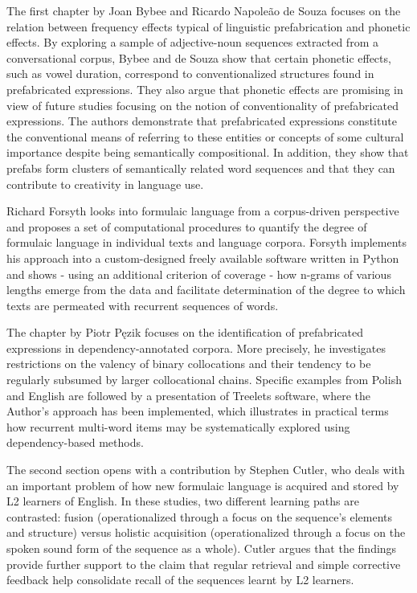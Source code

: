 \documentclass[output=paper]{langsci/langscibook}
\begin{document}
The first chapter by Joan Bybee and Ricardo Napoleão de Souza focuses on the relation between frequency effects typical of linguistic prefabrication and phonetic effects. By exploring a sample of adjective-noun sequences extracted from a conversational corpus, Bybee and de Souza show that certain phonetic effects, such as vowel duration, correspond to conventionalized structures found in prefabricated expressions. They also argue that phonetic effects are promising in view of future studies focusing on the notion of conventionality of prefabricated expressions. The authors demonstrate that prefabricated expressions constitute the conventional means of referring to these entities or concepts of some cultural importance despite being semantically compositional. In addition, they show that %
prefabs form clusters of semantically related word sequences and that they can contribute to creativity in language use.



Richard Forsyth looks into formulaic language from a corpus-driven perspective and proposes a set of computational procedures to quantify the degree of formulaic language in individual texts and language corpora. Forsyth implements his approach into a custom-designed freely available software written in Python and shows - using an additional criterion of coverage - how n-grams of various lengths  emerge from the data and facilitate determination of the degree to which texts are permeated with recurrent sequences of words.



The chapter by Piotr Pęzik focuses on the identification of prefabricated expressions in dependency-annotated corpora. More precisely, he investigates restrictions on the valency of binary collocations and their tendency to be regularly subsumed by larger collocational chains. Specific examples from Polish and English are followed by a presentation of Treelets software, where the Author’s approach has been implemented, which illustrates in practical terms how recurrent multi-word items may be systematically explored using dependency-based methods.



The second section opens with a contribution by Stephen Cutler, who deals with an important problem of how new formulaic language is acquired and stored by L2 learners of English. In these studies, two different learning paths are contrasted: fusion (operationalized through a focus on the sequence’s elements and structure) versus holistic acquisition (operationalized through a focus on the spoken sound form of the sequence as a whole). Cutler argues that the findings provide further support to the claim that regular retrieval and simple corrective feedback help consolidate recall of the sequences learnt by L2 learners.
\end{document}
